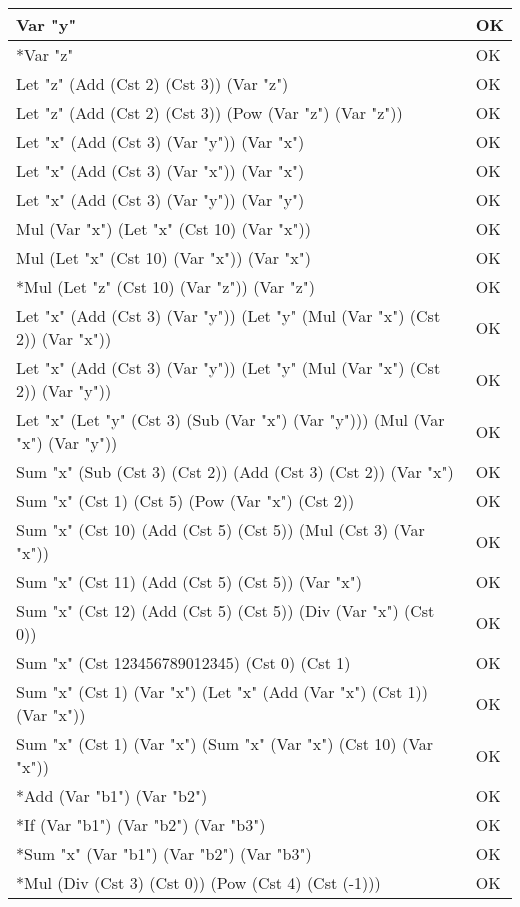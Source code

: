 \documentclass[12pt,a4paper]{article}
\begin{document}
\begin{tabularx}{\linewidth}[!htbp]{X|l}
    \hline
    Var "y" & OK \\
    \hline
    *Var "z" & OK \\
    \hline
    Let "z" (Add (Cst 2) (Cst 3)) (Var "z") & OK \\
    \hline
    Let "z" (Add (Cst 2) (Cst 3)) (Pow (Var "z") (Var "z")) & OK \\
    \hline
    Let "x" (Add (Cst 3) (Var "y")) (Var "x") & OK \\
    \hline
    Let "x" (Add (Cst 3) (Var "x")) (Var "x") & OK \\
    \hline
    Let "x" (Add (Cst 3) (Var "y")) (Var "y") & OK \\
    \hline
    Mul (Var "x") (Let "x" (Cst 10) (Var "x")) & OK \\
    \hline
    Mul (Let "x" (Cst 10) (Var "x")) (Var "x") & OK \\
    \hline
    *Mul (Let "z" (Cst 10) (Var "z")) (Var "z") & OK \\
    \hline
    Let "x" (Add (Cst 3) (Var "y")) (Let "y" (Mul (Var "x") (Cst 2)) (Var "x")) & OK \\
    \hline
    Let "x" (Add (Cst 3) (Var "y")) (Let "y" (Mul (Var "x") (Cst 2)) (Var "y")) & OK \\
    \hline
    Let "x" (Let "y" (Cst 3) (Sub (Var "x") (Var "y"))) (Mul (Var "x") (Var "y")) & OK \\
    \hline
    Sum "x" (Sub (Cst 3) (Cst 2)) (Add (Cst 3) (Cst 2)) (Var "x") & OK \\
    \hline
    Sum "x" (Cst 1) (Cst 5) (Pow (Var "x") (Cst 2)) & OK \\
    \hline
    Sum "x" (Cst 10) (Add (Cst 5) (Cst 5)) (Mul (Cst 3) (Var "x")) & OK \\
    \hline
    Sum "x" (Cst 11) (Add (Cst 5) (Cst 5)) (Var "x") & OK \\
    \hline
    Sum "x" (Cst 12) (Add (Cst 5) (Cst 5)) (Div (Var "x") (Cst 0)) & OK \\
    \hline
    Sum "x" (Cst 123456789012345) (Cst 0) (Cst 1) & OK \\
    \hline
    Sum "x" (Cst 1) (Var "x") (Let "x" (Add (Var "x") (Cst 1)) (Var "x")) & OK \\
    \hline
    Sum "x" (Cst 1) (Var "x") (Sum "x" (Var "x") (Cst 10) (Var "x")) & OK \\
    \hline
    *Add (Var "b1") (Var "b2") & OK \\
    \hline
    *If (Var "b1") (Var "b2") (Var "b3") & OK \\
    \hline
    *Sum "x" (Var "b1") (Var "b2") (Var "b3") & OK \\
    \hline
    *Mul (Div (Cst 3) (Cst 0)) (Pow (Cst 4) (Cst (-1))) & OK \\
     \hline
\end{tabularx}
\end{document}
